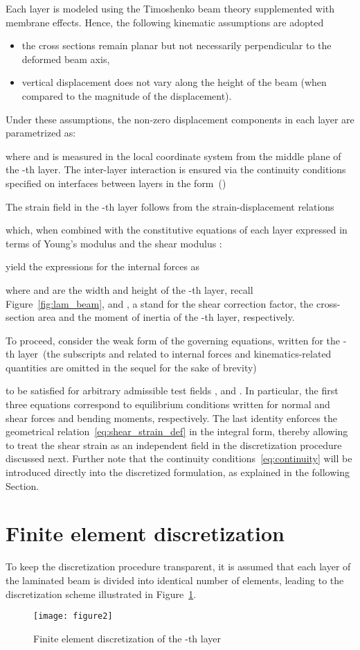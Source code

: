 \documentclass[times,a4paper,12pt]{elsarticle}
\begin{document}
Each layer is modeled using the Timoshenko beam theory supplemented
with membrane effects. Hence, the following kinematic assumptions
are adopted
\begin{itemize}
\item the cross sections remain planar but not necessarily
  perpendicular to the deformed beam axis,
\item vertical displacement does not vary along the height of the beam
  (when compared to the magnitude of the displacement).
\end{itemize}
Under these assumptions, the non-zero displacement components in each layer are parametrized as:

where  and  is measured in the local coordinate
system from the middle plane of the -th layer. The inter-layer
interaction is ensured via the continuity conditions specified on
interfaces between layers in the form~()

The strain field in the -th layer follows from the strain-displacement relations~\cite{Bittnar:1996:NMM,Bathe:1996:FEM}

which, when combined with the constitutive equations of each layer
expressed in terms of Young's modulus  and the shear modulus :

yield the expressions for the internal forces as

where  and  are the width and height of the -th
layer, recall Figure~\ref{fig:lam_beam}, and ,
 a 
stand for the shear correction factor, the cross-section area and the
moment of inertia of the -th layer, respectively.

To proceed, consider the weak form of the governing equations, written
for the -th layer~(the subscripts  and 
related to internal forces and kinematics-related quantities are
omitted in the sequel for the sake of brevity)

to be satisfied for arbitrary admissible test fields ,  and . In particular, the
first three equations correspond to equilibrium conditions written for
normal and shear forces and bending moments, respectively. The last
identity enforces the geometrical relation~\eqref{eq:shear_strain_def}
in the integral form, thereby allowing to treat the shear strain as an
independent field in the discretization procedure discussed
next. Further note that the continuity
conditions~\eqref{eq:continuity} will be introduced directly into the
discretized formulation, as explained in the following Section.

\section{Finite element discretization}\label{sec:discretization}
To keep the discretization procedure transparent, it is assumed that
each layer of the laminated beam is divided into identical number of
elements, leading to the discretization scheme illustrated in
Figure~\ref{fig:fin_elem}.
\begin{figure}[ht]
\centerline{\texttt{[image: figure2]} 
}\caption{Finite element discretization of the -th layer}
\label{fig:fin_elem}
\end{figure}
\end{document}
